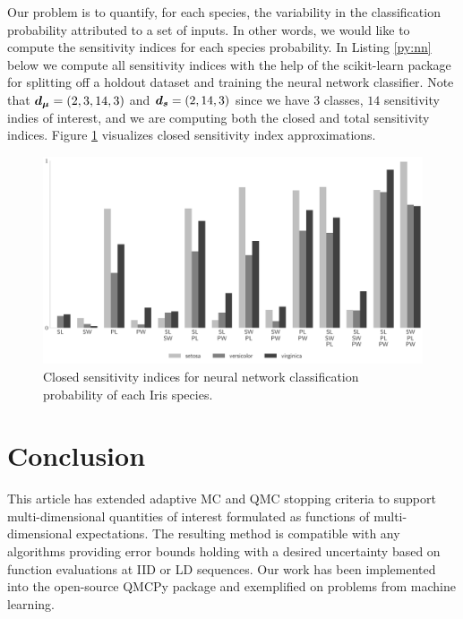 \documentclass{article}[12pt]
\begin{document}
Our problem is to quantify, for each species, the variability in the classification probability attributed to a set of inputs. In other words, we would like to compute the sensitivity indices for each species probability. In Listing \ref{py:nn} below we compute all sensitivity indices with the help of the scikit-learn package \cite{scikit-learn} for splitting off a holdout dataset and training the neural network classifier. Note that $\boldsymbol{d}_{\boldsymbol{\mu}} = (2,3,14,3)$ and $\boldsymbol{d}_{\boldsymbol{s}} = (2,14,3)$ since we have $3$ classes, $14$ sensitivity indies of interest, and we are computing both the closed and total sensitivity indices. Figure \ref{fig:nn_si} visualizes closed sensitivity index approximations. 



\begin{figure}[H]
    \centering
    \includegraphics[width=.8\textwidth]{figs/nn_si.pdf}
    \caption{Closed sensitivity indices for neural network classification probability of each Iris species.}
    \label{fig:nn_si}
\end{figure}

\section{Conclusion} \label{sec:conclusions}

This article has extended adaptive MC and QMC stopping criteria to support multi-dimensional quantities of interest formulated as functions of multi-dimensional expectations. The resulting method is compatible with any algorithms providing error bounds holding with a desired uncertainty based on function evaluations at IID or LD sequences. Our work has been implemented into the open-source QMCPy package and exemplified on problems from machine learning. 

\printbibliography
\end{document}
